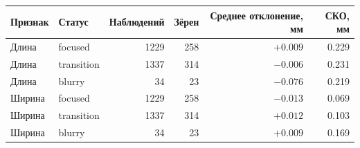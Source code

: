 \begin{tabular}{@{}llrrrr@{}}
\toprule
Признак & Статус & Наблюдений & Зёрен & Среднее отклонение, мм & СКО, мм \\
\midrule
Длина & focused & 1229 & 258 & $+\num{0.009}$ & \num{0.229} \\
Длина & transition & 1337 & 314 & $-\num{0.006}$ & \num{0.231} \\
Длина & blurry & 34 & 23 & $-\num{0.076}$ & \num{0.219} \\
Ширина & focused & 1229 & 258 & $-\num{0.013}$ & \num{0.069} \\
Ширина & transition & 1337 & 314 & $+\num{0.012}$ & \num{0.103} \\
Ширина & blurry & 34 & 23 & $+\num{0.009}$ & \num{0.169} \\
\bottomrule
\end{tabular}
